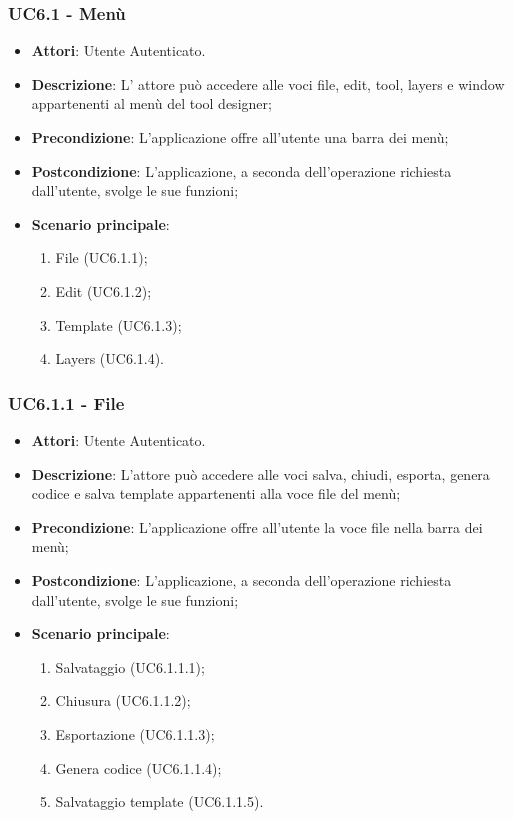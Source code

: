 \subsubsection{UC6.1 - Menù} 
\label{sssec:UC6.1} 
\begin{itemize} 
\item \textbf{Attori}: Utente Autenticato.
\item \textbf{Descrizione}: L’ attore può accedere alle voci file, edit, tool,
layers e window appartenenti al menù del tool designer;
\item \textbf{Precondizione}: L’applicazione offre all’utente una barra dei menù;
\item \textbf{Postcondizione}: L’applicazione, a seconda dell’operazione richiesta dall’utente,
svolge le sue funzioni;
\item \textbf{Scenario principale}: \begin{enumerate}\item File (UC6.1.1);\item Edit (UC6.1.2);\item Template (UC6.1.3);\item Layers (UC6.1.4). 
 \end{enumerate}
\end{itemize} 
\subsubsection{UC6.1.1 - File} 
\label{sssec:UC6.1.1} 
\begin{itemize} 
\item \textbf{Attori}: Utente Autenticato.
\item \textbf{Descrizione}: L’attore può accedere alle voci salva, chiudi, esporta, genera codice e salva template appartenenti alla voce file del menù;
\item \textbf{Precondizione}: L’applicazione offre all’utente la voce file nella barra dei menù;
\item \textbf{Postcondizione}: L’applicazione, a seconda dell’operazione richiesta dall’utente,
svolge le sue funzioni;
\item \textbf{Scenario principale}: \begin{enumerate}\item Salvataggio (UC6.1.1.1);\item Chiusura (UC6.1.1.2);\item Esportazione (UC6.1.1.3);\item Genera codice (UC6.1.1.4);\item Salvataggio template (UC6.1.1.5). 
 \end{enumerate}
\end{itemize} 
